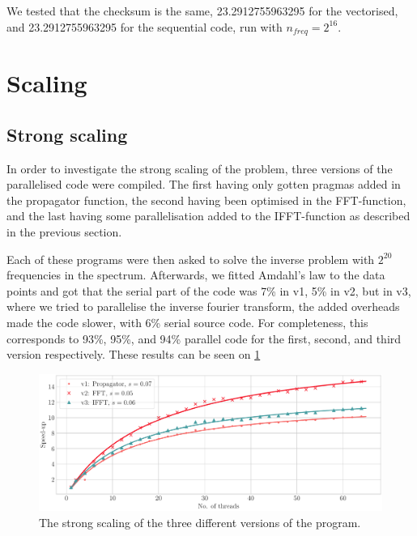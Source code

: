 \documentclass{article}
\begin{document}
We tested that the checksum is the same, 23.2912755963295 for the vectorised, and 23.2912755963295 for the sequential code, run with $n_{freq}=2^{16}$. 

\section{Scaling}
\subsection{Strong scaling}
In order to investigate the strong scaling of the problem, three versions of the parallelised code were compiled. The first having only gotten pragmas added in the propagator function, the second having been optimised in the FFT-function, and the last having some parallelisation added to the IFFT-function as described in the previous section.

Each of these programs were then asked to solve the inverse problem with \(2^{20}\) frequencies in the spectrum. Afterwards, we fitted Amdahl's law to the data points and got that the serial part of the code was 7\% in v1, 5\% in v2, but in v3, where we tried to parallelise the inverse fourier transform, the added overheads made the code slower, with 6\% serial source code.
For completeness, this corresponds to 93\%, 95\%, and 94\% parallel code for the first, second, and third version respectively. These results can be seen on \cref{fig:amdahl}
\begin{figure}
    \centering
    \includegraphics[width=\textwidth]{./figures/amdahl.pdf}
    \caption{The strong scaling of the three different versions of the program.}
    \label{fig:amdahl}
\end{figure}
\end{document}
